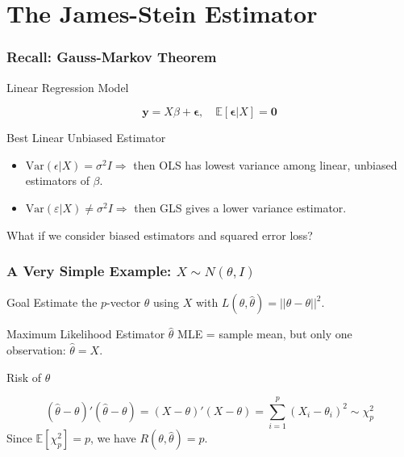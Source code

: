 \section{The James-Stein Estimator}
\begin{frame}
  \frametitle{Recall: Gauss-Markov Theorem}
  \begin{block}{Linear Regression Model}
    
    $$\mathbf{y} = X\beta + \boldsymbol{\epsilon}, \quad \mathbb{E}[\boldsymbol{\epsilon}|X] = \mathbf{0}$$
  \end{block}


  \begin{block}{Best Linear Unbiased Estimator}
    
    \begin{itemize}
      \item $\mbox{Var}(\epsilon|X) = \sigma^2 I \Rightarrow$ then OLS has lowest variance among linear, unbiased estimators of $\beta$.
      \item  $\mbox{Var}(\varepsilon|X)\neq \sigma^2 I \Rightarrow$ then GLS gives a lower variance estimator.  
    \end{itemize}
  \end{block}

  \begin{alertblock}{What if we consider biased estimators and squared error loss?}
    
  \end{alertblock}
    
\end{frame}
\begin{frame}
  \frametitle{A Very Simple Example: $X \sim N(\theta, I)$}

  \begin{block}{Goal}
    Estimate the $p$-vector $\theta$ using $X$ with $L(\theta, \widehat{\theta}) = \lvert\lvert \widehat{\theta} - \theta\rvert\rvert^2$.
  \end{block}

  \begin{block}{Maximum Likelihood Estimator $\widehat{\theta}$}
MLE = sample mean, but only one observation: $\hat{\theta} = X$.
  \end{block}

  \begin{block}{Risk of $\widehat{\theta}$}
    
    \vspace{-1em}
\begin{equation*}
  \left( \hat{\theta} - \theta \right)' \left( \hat{\theta}- \theta \right) = \left( X - \theta \right)'\left( X-\theta \right)= \sum_{i = 1}^{p} \left( X_{i} - \theta_i \right)^2 \sim \chi^2_p 
\end{equation*}
Since $\mathbb{E}[\chi^2_p]=p$, we have $R(\theta, \hat{\theta})=p$.
  \end{block}

\end{frame}
